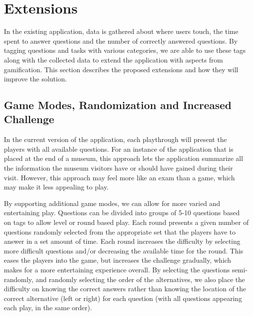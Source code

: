 \section{Extensions}

In the existing application, data is gathered about where users touch, the time spent to answer questions and the number of correctly answered questions. By tagging questions and tasks with various categories, we are able to use these tags along with the collected data to extend the application with aspects from gamification. This section describes the proposed extensions and how they will improve the solution.


\subsection{Game Modes, Randomization and Increased Challenge}

In the current version of the application, each playthrough will present the players with all available questions. For an instance of the application that is placed at the end of a museum, this approach lets the application summarize all the information the museum visitors have or should have gained during their visit. However, this approach may feel more like an exam than a game, which may make it less appealing to play.

By supporting additional game modes, we can allow for more varied and entertaining play. Questions can be divided into groups of 5-10 questions based on tags to allow level or round based play. Each round presents a given number of questions randomly selected from the appropriate set that the players have to answer in a set amount of time. Each round increases the difficulty by selecting more difficult questions and/or decreasing the available time for the round. This eases the players into the game, but increases the challenge gradually, which makes for a more entertaining experience overall. By selecting the questions semi-randomly, and randomly selecting the order of the alternatives, we also place the difficulty on knowing the correct answers rather than knowing the location of the correct alternative (left or right) for each question (with all questions appearing each play, in the same order).

